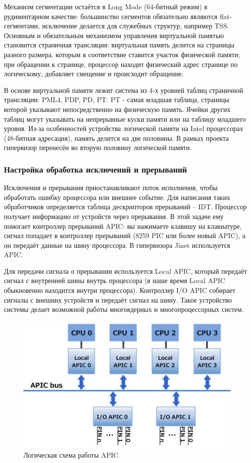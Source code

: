 \documentclass[a4paper,11pt]{extarticle}
\begin{document}
	Механизм сегментации остаётся в Long Mode (64-битный режим) в рудиментарном качестве: большинство сегментов обязательно являются flat-сегментами, исключение делается для служебных структур, например TSS. Основным и обязательным механизмом управления виртуальной памятью становится страничная трансляция: виртуальная память делится на страницы разного размера, которым в соответствие ставится участок физической памяти; при обращении к странице, процессор находит физический адрес странице по логическому, добавляет смещение и происходит обращение.\par
	В основе виртуальной памяти лежит система из 4-х уровней таблиц страничной трансляции: PML4, PDP, PD, PT. PT - самая младшая таблица, страницы которой указывают непосредственно на физическую память. Ячейки других таблиц могут указывать на непрерывные куски памяти или на таблицу младшего уровня. Из-за особенностей устройства логической памяти на Intel процессорах (48-битная адресация), память делится на две половины. В рамках проекта гипервизор перенесён во вторую половину логической памяти.
	
	\subsubsection{Настройка обработка исключений и прерываний}
	Исключения и прерывания приостанавливают поток исполнения, чтобы обработать ошибку процессора или внешнее событие. Для написания таких обработчиков определяется таблица дескрипторов прерываний – IDT. Процессор получает информацию от устройств через прерывания. В этой задаче ему помогает контроллер прерываний APIC: вы нажимаете клавишу на клавиатуре, сигнал попадает в контроллер прерываний (8259 PIC или более новый APIC), а он передаёт данные на шину процессора. В гипервизора Jinet используется APIC.\par
	Для передачи сигнала о прерывании используется Local APIC, который передаёт сигнал с внутренней шины внутрь процессора (в наше время Local APIC обыкновенно находится внутри процессора). Контроллер I/O APIC собирает сигналы с внешних устройств и передаёт сигнал на шину. Такое устройство системы делает возможной работы многоядерных и многопроцессорных систем.
	\begin{figure}[htb]
		\centering
		\includegraphics[width=0.7\linewidth]{../diagrams/ioapic.jpg}
		\caption{Логическая схема работы APIC}
		\label{fig:ioapic}
	\end{figure}
	
\end{document}
